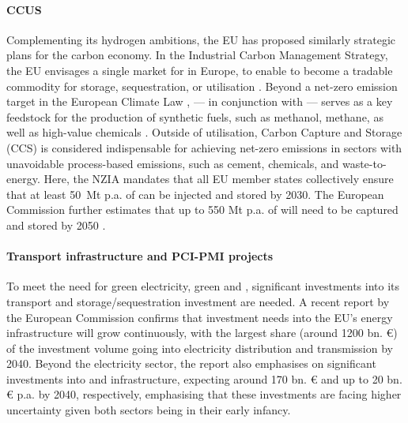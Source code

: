 \documentclass[preprint,12pt,sort&compress]{elsarticle}
\begin{document}
\paragraph{CCUS}
Complementing its hydrogen ambitions, the EU has proposed similarly strategic plans for the carbon economy. In the Industrial Carbon Management Strategy, the EU envisages a single market for  in Europe, to enable  to become a tradable commodity for storage, sequestration, or utilisation \cite{europeancourtofauditorsEUsIndustrialPolicy2024}. Beyond a net-zero emission target in the European Climate Law \cite{europeanparliamentRegulationEU20212021},  --- in conjunction with  --- serves as a key feedstock for the production of synthetic fuels, such as methanol, methane, as well as high-value chemicals \cite{neumannPotentialRoleHydrogen2023}. Outside of  utilisation, Carbon Capture and Storage (CCS) is considered indispensable for achieving net-zero emissions in sectors with unavoidable process-based  emissions, such as cement, chemicals, and waste-to-energy. Here, the NZIA mandates that all EU member states collectively ensure that at least \SI{50}{Mt} p.a. of  can be injected and stored by 2030. The European Commission further estimates that up to 550 Mt p.a. of  will need to be captured and stored by 2050 \cite{europeanparliamentRegulationEU20242024}.

\paragraph{Transport infrastructure and PCI-PMI projects}
To meet the need for green electricity, green  and , significant investments into its transport and storage/sequestration investment are needed. A recent report by the European Commission \cite{europeancommission.directorategeneralforenergy.InvestmentNeedsEuropean2025} confirms that investment needs into the EU's energy infrastructure will grow continuously, with the largest share (around 1200 bn. \euro{}) of the investment volume going into electricity distribution and transmission by 2040. Beyond the electricity sector, the report also emphasises on significant investments into  and  infrastructure, expecting around 170 bn. \euro{} and up to 20 bn. \euro{} p.a. by 2040, respectively, emphasising that these investments are facing higher uncertainty given both sectors being in their early infancy.
\end{document}
